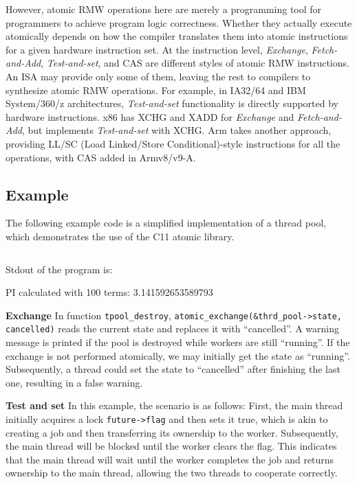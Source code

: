 \documentclass[fontsize=10pt, oneside]{scrartcl}
\newcommand{\monobox}[1]{\mbox{\texttt{#1}}}
\newcommand{\clang}[1]{C}
\newcommand{\introduce}[1]{\textit{#1}}
\begin{document}
However, atomic \textsc{RMW} operations here are merely a programming tool for programmers to achieve program logic correctness. 
Whether they actually execute atomically depends on how the compiler translates them into atomic instructions for a given hardware instruction set.
At the instruction level, \introduce{Exchange}, \introduce{Fetch-and-Add}, \introduce{Test-and-set}, and \textsc{CAS} are different styles of atomic \textsc{RMW} instructions.
An ISA may provide only some of them,
leaving the rest to compilers to synthesize atomic \textsc{RMW} operations. 
For example, in IA32/64 and IBM System/360/z architectures,
\introduce{Test-and-set} functionality is directly supported by hardware instructions. 
x86 has XCHG and XADD for \introduce{Exchange} and \introduce{Fetch-and-Add}, but implements \introduce{Test-and-set} with XCHG.
Arm takes another approach, providing LL/SC (Load Linked/Store Conditional)-style instructions for all the operations,
with \textsc{CAS} added in Armv8/v9-A.

\subsection{Example}
\label{rmw_example}
The following example code is a simplified implementation of a thread pool, which demonstrates the use of the \clang{}11 atomic library.

\inputminted{c}{./examples/rmw_example.c}

Stdout of the program is:
\begin{ccode}
PI calculated with 100 terms: 3.141592653589793
\end{ccode}

\textbf{Exchange}
In function \monobox{tpool\_destroy}, \monobox{atomic\_exchange(\&thrd\_pool->state, cancelled)} reads the current state and replaces it with ``cancelled''. 
A warning message is printed if the pool is destroyed while workers are still ``running''. 
If the exchange is not performed atomically, we may initially get the state as ``running''. Subsequently, a thread could set the state to ``cancelled'' after finishing the last one, resulting in a false warning.

\textbf{Test and set}
In this example, the scenario is as follows: 
First, the main thread initially acquires a lock \monobox{future->flag} and then sets it true, 
which is akin to creating a job and then transferring its ownership to the worker. 
Subsequently, the main thread will be blocked until the worker clears the flag. 
This indicates that the main thread will wait until the worker completes the job and returns ownership to the main thread, allowing the two threads to cooperate correctly.
\end{document}
